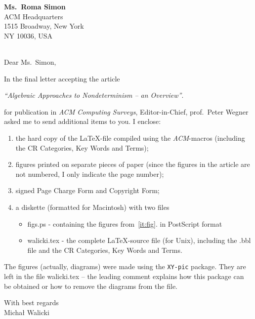 

\begin{letter}{ {\bf Ms.~Roma Simon} \\ ACM Headquarters\\
  1515 Broadway, New York \\
  NY 10036, USA }
\address{Micha{\l} Walicki \\ University of Bergen, Dept. of Informatics\\
         H{\o}yteknologisenteret, 5020 Bergen, NORWAY \\
         {\small{{\em e-mail:} michal@ii.uib..no}} }


\opening{\ \\[4ex] Dear Ms.~Simon,}
In the final letter accepting the article
\begin{center}
{\em ``Algebraic Approaches to Nondeterminism -- an Overview''}.
\end{center}
for publication in  {\em ACM Computing Surveys}, Editor-in-Chief, 
 prof.~Peter Wegner asked me to send additional items to you.
I enclose:
\begin{enumerate}
\item
the hard copy of the \LaTeX-file compiled using the {\em ACM}-macros (including
 the CR Categories, Key Words and Terms);
\item\label{it:fig}
figures printed on separate pieces of paper (since the figures in the article
 are not numbered, I only indicate the page number);
\item
signed Page Charge Form and Copyright Form;
\item
a diskette (formatted for Macintosh) with two files
\begin{itemize}
\item {\sf figs.ps} - containing the figures from~\ref{it:fig}. in PostScript format
\item {\sf walicki.tex} - the complete \LaTeX-source file (for Unix), including
 the {\sf .bbl} file and the CR Categories, Key Words and Terms.
\end{itemize}
\end{enumerate}
The figures (actually, diagrams) %
were made using the {\tt XY-pic} package. They are left in the file 
{\sf walicki.tex} -- the leading
comment explains how this package can be obtained or how to
remove the diagrams from the file.

\vspace*{8ex}
\hspace*{18em} With best regards \\[8ex]
\hspace*{19em} Micha{\l} Walicki

\end{letter}
